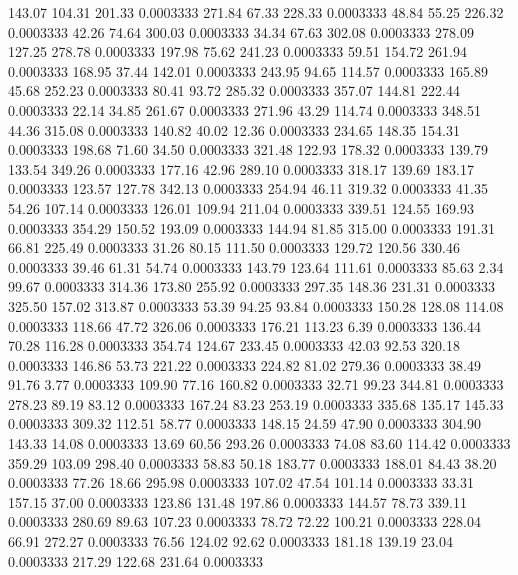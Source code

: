  143.07  104.31  201.33   0.0003333
 271.84   67.33  228.33   0.0003333
  48.84   55.25  226.32   0.0003333
  42.26   74.64  300.03   0.0003333
  34.34   67.63  302.08   0.0003333
 278.09  127.25  278.78   0.0003333
 197.98   75.62  241.23   0.0003333
  59.51  154.72  261.94   0.0003333
 168.95   37.44  142.01   0.0003333
 243.95   94.65  114.57   0.0003333
 165.89   45.68  252.23   0.0003333
  80.41   93.72  285.32   0.0003333
 357.07  144.81  222.44   0.0003333
  22.14   34.85  261.67   0.0003333
 271.96   43.29  114.74   0.0003333
 348.51   44.36  315.08   0.0003333
 140.82   40.02   12.36   0.0003333
 234.65  148.35  154.31   0.0003333
 198.68   71.60   34.50   0.0003333
 321.48  122.93  178.32   0.0003333
 139.79  133.54  349.26   0.0003333
 177.16   42.96  289.10   0.0003333
 318.17  139.69  183.17   0.0003333
 123.57  127.78  342.13   0.0003333
 254.94   46.11  319.32   0.0003333
  41.35   54.26  107.14   0.0003333
 126.01  109.94  211.04   0.0003333
 339.51  124.55  169.93   0.0003333
 354.29  150.52  193.09   0.0003333
 144.94   81.85  315.00   0.0003333
 191.31   66.81  225.49   0.0003333
  31.26   80.15  111.50   0.0003333
 129.72  120.56  330.46   0.0003333
  39.46   61.31   54.74   0.0003333
 143.79  123.64  111.61   0.0003333
  85.63    2.34   99.67   0.0003333
 314.36  173.80  255.92   0.0003333
 297.35  148.36  231.31   0.0003333
 325.50  157.02  313.87   0.0003333
  53.39   94.25   93.84   0.0003333
 150.28  128.08  114.08   0.0003333
 118.66   47.72  326.06   0.0003333
 176.21  113.23    6.39   0.0003333
 136.44   70.28  116.28   0.0003333
 354.74  124.67  233.45   0.0003333
  42.03   92.53  320.18   0.0003333
 146.86   53.73  221.22   0.0003333
 224.82   81.02  279.36   0.0003333
  38.49   91.76    3.77   0.0003333
 109.90   77.16  160.82   0.0003333
  32.71   99.23  344.81   0.0003333
 278.23   89.19   83.12   0.0003333
 167.24   83.23  253.19   0.0003333
 335.68  135.17  145.33   0.0003333
 309.32  112.51   58.77   0.0003333
 148.15   24.59   47.90   0.0003333
 304.90  143.33   14.08   0.0003333
  13.69   60.56  293.26   0.0003333
  74.08   83.60  114.42   0.0003333
 359.29  103.09  298.40   0.0003333
  58.83   50.18  183.77   0.0003333
 188.01   84.43   38.20   0.0003333
  77.26   18.66  295.98   0.0003333
 107.02   47.54  101.14   0.0003333
  33.31  157.15   37.00   0.0003333
 123.86  131.48  197.86   0.0003333
 144.57   78.73  339.11   0.0003333
 280.69   89.63  107.23   0.0003333
  78.72   72.22  100.21   0.0003333
 228.04   66.91  272.27   0.0003333
  76.56  124.02   92.62   0.0003333
 181.18  139.19   23.04   0.0003333
 217.29  122.68  231.64   0.0003333
